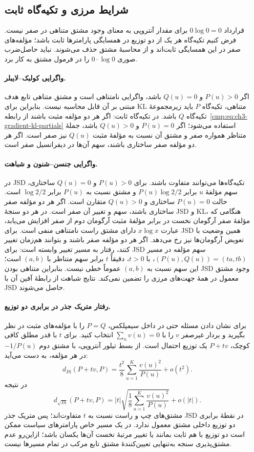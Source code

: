 \subsection{شرایط مرزی و تکیه‌گاه ثابت}
\label{app:ch3-gradient-measures-boundary}

قرارداد $0\log0=0$ برای مقدار آنتروپی
به معنای وجود مشتق متناهی در صفر نیست.
فرض کنیم تکیه‌گاه هر یک از دو توزیع در
همسایگی پارامترها ثابت باشد؛ مؤلفه‌های صفر
در این همسایگی ثابت‌اند و از محاسبهٔ مشتق
حذف می‌شوند. نباید حاصل‌ضرب صوری
$0\cdot\log0$ را در فرمول مشتق به کار برد.

\paragraph{واگرایی کولبک--لایبلر.}
اگر $P(u)>0$ و $Q(u)=0$ باشد، واگرایی
نامتناهی است و مشتق متناهی تابع هدف مبتنی
بر آن قابل محاسبه نیست. بنابراین برای KL
متناهی، تکیه‌گاه $P$ باید زیرمجموعهٔ
تکیه‌گاه $Q$ باشد. در تکیه‌گاه ثابت:
اگر هر دو مؤلفه مثبت باشند از
رابطه~\eqref{cmp:eq:ch3-gradient-kl-partials}
استفاده می‌شود؛ اگر $P(u)=0$ و $Q(u)>0$
باشد، جملهٔ متناظر همواره صفر و مشتق آن
نسبت به مؤلفهٔ مثبت $Q(u)$ نیز صفر است.
اگر هر دو مؤلفه صفر ساختاری باشند، سهم
آن‌ها در دیفرانسیل صفر است.

\paragraph{واگرایی جنسن--شنون و شباهت.}
در JSD تکیه‌گاه‌ها می‌توانند متفاوت باشند.
برای $P(u)>0$ و $Q(u)=0$ ساختاری،
سهم مؤلفهٔ $u$ برابر $P(u)\log2/2$ و
مشتق نسبت به $P(u)$ برابر $\log2/2$ است.
حالت $P(u)=0$ ساختاری و $Q(u)>0$ متقارن
است. اگر هر دو مؤلفه صفر ساختاری باشند،
سهم و تغییر آن صفر است. در هر دو سنجهٔ
JSD و KL، هنگامی که مؤلفهٔ صفر آرگومان
نخست در برابر مؤلفهٔ مثبت آرگومان دوم
از صفر افزایش می‌یابد، عبارت $x\log x$
دارای مشتق راست نامتناهی منفی است.
برای JSD همین وضعیت با تعویض آرگومان‌ها
نیز رخ می‌دهد. اگر هر دو مؤلفه صفر باشند
و بتوانند هم‌زمان تغییر کنند، رفتار به مسیر
تغییر وابسته است: برای JSD سهم مؤلفه در
مسیر $(P(u),Q(u))=(ta,tb)$، با $t>0$،
دقیقاً $t$ برابر سهم متناظر با $(a,b)$ است؛
این سهم نسبت به $(a,b)$ عموماً خطی نیست.
بنابراین متناهی بودن JSD وجود مشتق معمول
در همهٔ جهت‌های مرزی را تضمین نمی‌کند.
نتایج شباهت از رابطهٔ آفین آن با JSD حاصل
می‌شوند.

\paragraph{رفتار متریک جذر در برابری دو توزیع.}
برای نشان دادن مسئله حتی در داخل سیمپلکس،
$P=Q$ را با مؤلفه‌های مثبت در نظر بگیرید
و بردار غیرصفر $v$ را با $\sum_u v(u)=0$
انتخاب کنید. برای $t$ با قدر مطلق کافی کوچک،
$P+tv$ یک توزیع احتمال است. از بسط تیلور
آنتروپی، با مشتق دوم $-1/P(u)$ در هر
مؤلفه، به دست می‌آید:
\[
d_{\mathrm{JS}}(P+tv,P)
=\frac{t^2}{8}\sum_{u=1}^{K}\frac{v(u)^2}{P(u)}
+o(t^2).
\]
در نتیجه
\[
d_{\sqrt{\mathrm{JS}}}(P+tv,P)
=|t|\sqrt{\frac18\sum_{u=1}^{K}
\frac{v(u)^2}{P(u)}}+o(|t|).
\]
مشتق‌های چپ و راست نسبت به $t$ متفاوت‌اند؛
پس متریک جذر JSD در نقطهٔ برابری دو
توزیع داخلی مشتق معمول ندارد. در یک مسیر
خاص پارامترهای سیاست ممکن است دو توزیع
با هم ثابت بمانند یا تغییر مرتبهٔ نخست
آن‌ها یکسان باشد؛ ازاین‌رو عدم مشتق‌پذیری
سنجه به‌تنهایی تعیین‌کنندهٔ مشتق تابع مرکب
در تمام مسیرها نیست.


